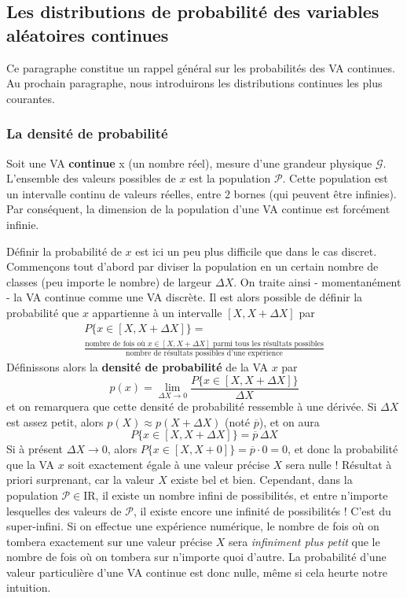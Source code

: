 \documentclass[main.tex]{subfiles}
\begin{document}
\subsection{Les distributions de probabilité des variables aléatoires continues}

Ce paragraphe constitue un rappel général sur les probabilités des VA continues. Au prochain paragraphe, nous introduirons les distributions continues les plus courantes.

\subsubsection{La densité de probabilité}

Soit une VA \textbf{continue} x (un nombre réel), mesure d'une grandeur physique $\mathcal{G}$. L'ensemble des valeurs possibles de $x$ est la population $\mathcal{P}$. Cette population est un intervalle continu de valeurs réelles, entre 2 bornes (qui peuvent être infinies). Par conséquent, la dimension de la population d'une VA continue est forcément infinie.

Définir la probabilité de $x$ est ici un peu plus difficile que dans le cas discret. Commençons tout d'abord par diviser la population en un certain nombre de classes (peu importe le nombre) de largeur $\Delta X$. On traite ainsi - momentanément - la VA continue comme une VA discrète. Il est alors possible de définir la probabilité que $x$ appartienne à un intervalle $[X,X+\Delta X]$ par
\begin{multline}
    P\{x\in[X,X+\Delta X]\}=\\
    \frac{\text{nombre de fois où $x\in[X,X+\Delta X]$ parmi tous les résultats possibles}}{\text{nombre de résultats possibles d'une expérience}}
    \label{eq:ddlppuvac}
\end{multline}
Définissons alors la \textbf{densité de probabilité} de la VA $x$ par
\begin{equation}
    p(x)=\lim_{\Delta X\rightarrow 0}\frac{P\{x\in[X,X+\Delta X]\}}{\Delta X}
\end{equation}
et on remarquera que cette densité de probabilité ressemble à une dérivée. Si $\Delta X$ est assez petit, alors $p(X)\approx p(X\!+\!\Delta X)$ (noté $\overline{p}$), et on aura
\begin{equation*}
    P\{x\in[X,X+\Delta X]\}=\overline{p}\,\Delta X
\end{equation*}
Si à présent $\Delta X\rightarrow0$, alors $P\{x\in[X,X+0]\}=\overline{p}\cdot 0=0$, et donc la probabilité que la VA $x$ soit exactement égale à une valeur précise $X$ sera nulle ! Résultat à priori surprenant, car la valeur $X$ existe bel et bien. Cependant, dans la population $\mathcal{P}\in\text{I}\!\text{R}$, il existe un nombre infini de possibilités, et entre n'importe lesquelles des valeurs de $\mathcal{P}$, il existe encore une infinité de possibilités ! C'est du super-infini. Si on effectue une expérience numérique, le nombre de fois où on tombera exactement sur une valeur précise $X$ sera \textit{infiniment plus petit} que le nombre de fois où on tombera sur n'importe quoi d'autre. La probabilité d'une valeur particulière d'une VA continue est donc nulle, même si cela heurte notre intuition.
\end{document}
